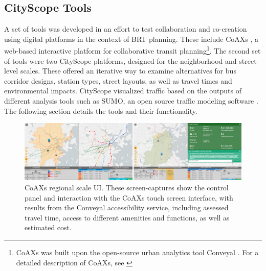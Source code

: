 {    \subsection{CityScope Tools}
    {
        A set of tools was developed in an effort to test collaboration and co-creation using digital platforms in the context of BRT planning. These include CoAXs \cite{stewart2016coaxs}, a web-based interactive platform for collaborative transit planning\footnote{CoAXs was built upon the open-source urban analytics tool Conveyal \cite{Conveyal33:online}. For a detailed description of CoAXs, see \cite{stewart2016coaxs}}. The second set of tools were two CityScope platforms, designed for the neighborhood and street-level scales. These offered an iterative way to examine alternatives for bus corridor designs, station types, street layouts, as well as travel times and environmental impacts. CityScope visualized traffic based on the outputs of different analysis tools such as SUMO, an open source traffic modeling software \cite{krajzewicz2012recent}. The following section details the tools and their functionality.

        \begin{figure}[!htb]
            \begin{center}
                \includegraphics[width=1\textwidth]{chapters/consensus/BRT/figures/brt4.jpeg}
            \end{center}
            \caption{CoAXs regional scale UI. These screen-captures show the control panel and interaction with the CoAXs touch screen interface, with results from the Conveyal accessibility service, including assessed travel time, access to different amenities and functions, as well as estimated cost.}
            \label{fig:brt_street_CoAXs}
        \end{figure}

}}
